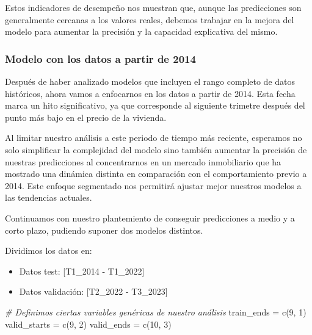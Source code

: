 \documentclass[
]{article}
\newenvironment{Shaded}{\begin{snugshade}}{\end{snugshade}}
\newcommand{\CommentTok}[1]{\textcolor[rgb]{0.56,0.35,0.01}{\textit{#1}}}
\newcommand{\DecValTok}[1]{\textcolor[rgb]{0.00,0.00,0.81}{#1}}
\newcommand{\FunctionTok}[1]{\textcolor[rgb]{0.00,0.00,0.00}{#1}}
\newcommand{\NormalTok}[1]{#1}
\newcommand{\OtherTok}[1]{\textcolor[rgb]{0.56,0.35,0.01}{#1}}
\begin{document}
Estos indicadores de desempeño nos muestran que, aunque las predicciones
son generalmente cercanas a los valores reales, debemos trabajar en la
mejora del modelo para aumentar la precisión y la capacidad explicativa
del mismo.

\hypertarget{modelo-con-los-datos-a-partir-de-2014}{%
\subsubsection{Modelo con los datos a partir de
2014}\label{modelo-con-los-datos-a-partir-de-2014}}

Después de haber analizado modelos que incluyen el rango completo de
datos históricos, ahora vamos a enfocarnos en los datos a partir de
2014. Esta fecha marca un hito significativo, ya que corresponde al
siguiente trimetre después del punto más bajo en el precio de la
vivienda.

Al limitar nuestro análisis a este periodo de tiempo más reciente,
esperamos no solo simplificar la complejidad del modelo sino también
aumentar la precisión de nuestras predicciones al concentrarnos en un
mercado inmobiliario que ha mostrado una dinámica distinta en
comparación con el comportamiento previo a 2014. Este enfoque segmentado
nos permitirá ajustar mejor nuestros modelos a las tendencias actuales.

Continuamos con nuestro plantemiento de conseguir predicciones a medio y
a corto plazo, pudiendo suponer dos modelos distintos.

Dividimos los datos en:

\begin{itemize}
\item
  Datos test: {[}T1\_2014 - T1\_2022{]}
\item
  Datos validación: {[}T2\_2022 - T3\_2023{]}
\end{itemize}

\begin{Shaded}
\begin{Highlighting}[]
\CommentTok{\# Definimos ciertas variables genéricas de nuestro análisis}
\NormalTok{train\_ends }\OtherTok{=} \FunctionTok{c}\NormalTok{(}\DecValTok{9}\NormalTok{, }\DecValTok{1}\NormalTok{)}
\NormalTok{valid\_starts }\OtherTok{=} \FunctionTok{c}\NormalTok{(}\DecValTok{9}\NormalTok{, }\DecValTok{2}\NormalTok{)}
\NormalTok{valid\_ends }\OtherTok{=} \FunctionTok{c}\NormalTok{(}\DecValTok{10}\NormalTok{, }\DecValTok{3}\NormalTok{)}
\end{Highlighting}
\end{Shaded}
\end{document}
